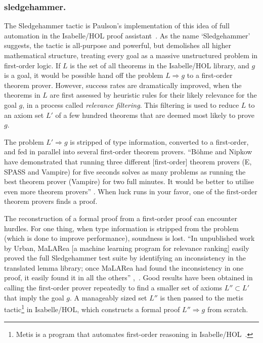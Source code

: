 \documentclass{llncs}
\begin{document}
\subsubsection{sledgehammer.}

The Sledgehammer tactic is Paulson's implementation of this idea of full automation in
the Isabelle/HOL proof assistant~\cite{Paar}.  As the name `Sledgehammer' suggests,
the tactic is all-purpose and powerful, but demolishes all higher
mathematical structure, treating every goal as a massive unstructured
problem in first-order logic.  If $L$ is the set of all theorems in
the Isabelle/HOL library, and $g$ is a goal, it would be possible hand
off the problem $L\Longrightarrow g$ to a first-order theorem
prover.  However, success rates are dramatically improved, when the
theorems in $L$ are first assessed by heuristic rules for their likely
relevance for the goal $g$, in a process called {\it relevance
  filtering}. 
This filtering is used to reduce $L$ to an axiom set $L'$ of a
few hundred theorems that are deemed most likely to prove $g$.

The problem $L'\Longrightarrow g$ is stripped of type information,
converted to a first-order, and fed in parallel into several
first-order theorem provers.
 ``B\"ohme and Nipkow \cite{Boehme-Nipkow-IJCAR10} have demonstrated that
running three different [first-order] theorem provers (E, SPASS and
Vampire) for five seconds solves as many problems as running the
best theorem prover (Vampire) for two full minutes.  It would be
better to utilise even more theorem provers'' 
\cite{Paar}.
When luck runs in your favor, one of the first-order theorem provers
finds a proof.

The reconstruction of a formal proof from a first-order proof can
encounter hurdles.  For one thing, when type information is stripped
from the problem (which is done to improve performance), soundness is
lost.  ``In unpublished work by Urban, MaLARea [a machine learning
program for relevance ranking] easily proved the full Sledgehammer
test suite by identifying an inconsistency in the translated lemma
library; once MaLARea had found the inconsistency in one proof, it
easily found it in all the others'' \cite{Paar},~\cite{UrM}.
Good results have been obtained in calling the first-order prover
repeatedly to find a smaller set of axioms $L''\subset L'$ that imply
the goal $g$. A manageably sized set $L''$ is then passed to the metis
tactic\footnote{Metis is a program that automates first-order
  reasoning in Isabelle/HOL~\cite{Metis}.} in Isabelle/HOL, which
constructs a formal proof $L''\Longrightarrow g$ from scratch.
\end{document}
